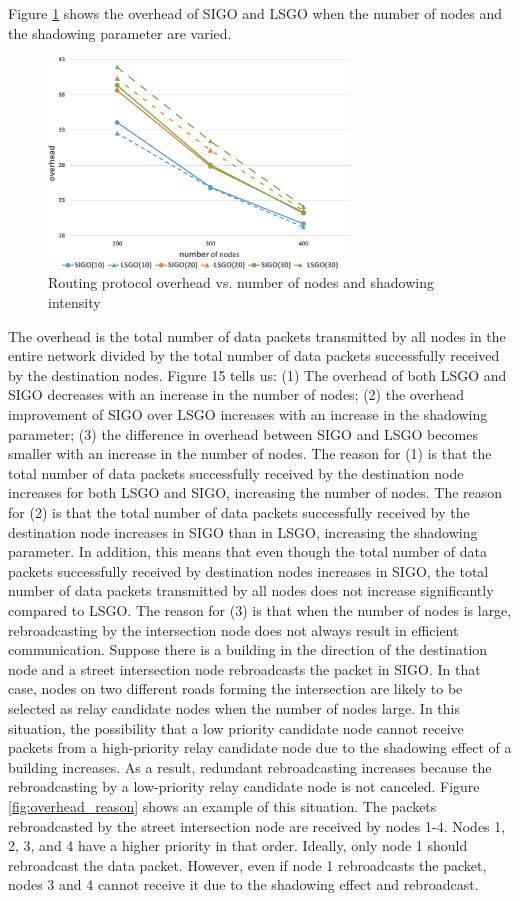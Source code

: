 \documentclass[conference]{IEEEtran}
\begin{document}
Figure \ref{fig:overhead} shows the overhead of SIGO and LSGO when the number of nodes and the shadowing parameter are varied.
\begin{figure}[!ht]
\centering
\includegraphics[width=80mm]{figures/overhead.eps}
\caption{Routing protocol overhead vs. number of nodes and shadowing intensity }
\label{fig:overhead}
\end{figure}
The overhead is the total number of data packets transmitted by all nodes in the entire network divided by the total number of data packets successfully received by the destination nodes.
Figure 15 tells us: (1) The overhead of both LSGO and SIGO decreases with an increase in the number of nodes; (2) the overhead improvement of SIGO over LSGO increases with an increase in the shadowing parameter; (3) the difference in overhead between SIGO and LSGO becomes smaller with an increase in the number of nodes. The reason for (1) is that the total number of data packets successfully received by the destination node increases for both LSGO and SIGO, increasing the number of nodes. The reason for (2) is that the total number of data packets successfully received by the destination node increases in SIGO than in LSGO, increasing the shadowing parameter. In addition, this means that even though the total number of data packets successfully received by destination nodes increases in SIGO, the total number of data packets transmitted by all nodes does not increase signiﬁcantly compared to LSGO. The reason for (3) is that when the number of nodes is large, rebroadcasting by the intersection node does not always result in efficient communication. Suppose there is a building in the direction of the destination node and a street intersection node rebroadcasts the packet in SIGO. In that case, nodes on two different roads forming the intersection are likely to be selected as relay candidate nodes when the number of nodes large. In this situation, the possibility that a low priority candidate node cannot receive packets from a high-priority relay candidate node due to the shadowing effect of a building increases. As a result, redundant rebroadcasting increases because the rebroadcasting by a low-priority relay candidate node is not canceled. Figure \ref{fig:overhead_reason} shows an example of this situation. The packets rebroadcasted by the street intersection node are received by nodes 1-4. Nodes 1, 2, 3, and 4 have a higher priority in that order. Ideally, only node 1 should rebroadcast the data packet. However, even if node 1 rebroadcasts the packet, nodes 3 and 4 cannot receive it due to the shadowing effect and rebroadcast.
\end{document}
